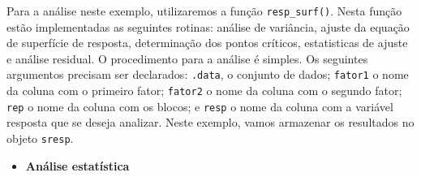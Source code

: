 \documentclass[
]{book}
\providecommand{\tightlist}{%
  \setlength{\itemsep}{0pt}\setlength{\parskip}{0pt}}
\begin{document}
Para a análise neste exemplo, utilizaremos a função \texttt{resp\_surf()}. Nesta função estão implementadas as seguintes rotinas: análise de variância, ajuste da equação de superfície de resposta, determinação dos pontos críticos, estatisticas de ajuste e análise residual. O procedimento para a análise é simples. Os seguintes argumentos precisam ser declarados: \texttt{.data}, o conjunto de dados; \texttt{fator1} o nome da coluna com o primeiro fator; \texttt{fator2} o nome da coluna com o segundo fator; \texttt{rep} o nome da coluna com os blocos; e \texttt{resp} o nome da coluna com a variável resposta que se deseja analizar. Neste exemplo, vamos armazenar os resultados no objeto \texttt{sresp}.

\begin{itemize}
\tightlist
\item
  \textbf{Análise estatística}
\end{itemize}
\end{document}

